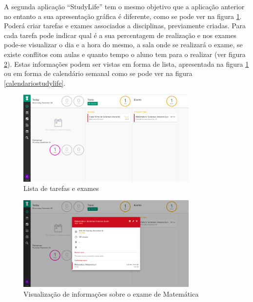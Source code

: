 \documentclass[11pt, twoside]{report}
\begin{document}
	A segunda aplicação ``StudyLife'' tem o mesmo objetivo que a aplicação anterior no entanto a sua apresentação gráfica é diferente, como se pode ver na figura \ref{listastudylife}.
	Poderá criar tarefas e exames associados a disciplinas, previamente criadas.
	Para cada tarefa pode indicar qual é a sua percentagem de realização e nos exames pode-se visualizar o dia e a hora do mesmo, a sala onde se realizará o exame, se existe conflitos com aulas e quanto tempo o aluno tem para o realizar (ver figura \ref{examematematica}). 
	Estas informações podem ser vistas em forma de lista, apresentada na figura \ref{listastudylife} ou em forma de calendário semanal como se pode ver na figura \ref{calendariostudylife}.	
	
\begin{figure}[H] 
	\centering 
	\includegraphics[width=0.8\textwidth,height=0.8\textheight,keepaspectratio]{image/estadodearte/calendario}
	\caption{Lista de tarefas e exames}
	\label{listastudylife}
\end{figure}

\begin{figure}[H] 
	\centering 
	\includegraphics[width=0.8\textwidth,height=0.8\textheight,keepaspectratio]{image/estadodearte/informacoesexame}
	\caption{Visualização de informações sobre o exame de Matemática}
	\label{examematematica}
\end{figure}
\end{document}
